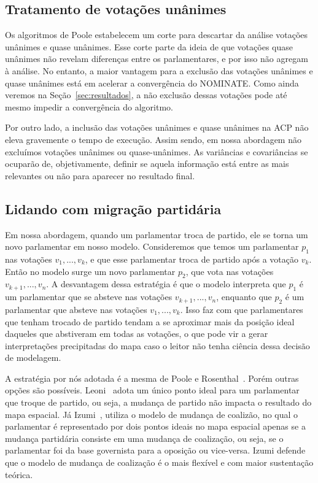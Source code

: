 \documentclass[a4paper, 12pt]{article}
\newcommand\nominate{NOMINATE\xspace}
\begin{document}
\subsection{Tratamento de votações unânimes}

Os algoritmos de Poole estabelecem um corte para descartar da análise votações unânimes e quase unânimes. Esse corte parte da ideia de que votações quase unânimes não revelam diferenças entre os parlamentares, e por isso não agregam à análise. No entanto, a maior vantagem para a exclusão das votações unânimes e quase unânimes está em acelerar a convergência do \nominate. Como ainda veremos na Seção~\ref{sec:resultados}, a não exclusão dessas votações pode até mesmo impedir a convergência do algoritmo.

Por outro lado, a inclusão das votações unânimes e quase unânimes na ACP não eleva gravemente o tempo de execução. Assim sendo, em nossa abordagem não excluímos votações unânimes ou quase-unânimes. As variâncias e covariâncias se ocuparão de, objetivamente, definir se aquela informação está entre as mais relevantes ou não para aparecer no resultado final.

\subsection{Lidando com migração partidária}

Em nossa abordagem, quando um parlamentar troca de partido, ele se torna um novo parlamentar em nosso modelo. Consideremos que temos um parlamentar $p_1$ nas votações $v_1, ..., v_k$, e que esse parlamentar troca de partido após a votação $v_k$. Então no modelo surge um novo parlamentar $p_2$, que vota nas votações $v_{k+1}, ..., v_n$. A desvantagem dessa estratégia é que o modelo interpreta que $p_1$ é um parlamentar que se absteve nas votações $v_{k+1}, ..., v_n$, enquanto que $p_2$ é um parlamentar que absteve nas votações $v_1, ..., v_k$. Isso faz com que parlamentares que tenham trocado de partido tendam a se aproximar mais da posição ideal daqueles que abstiveram em todas as votações, o que pode vir a gerar interpretações precipitadas do mapa caso o leitor não tenha ciência dessa decisão de modelagem.

A estratégia por nós adotada é a mesma de Poole e Rosenthal~\cite{poole2007ideology}. Porém outras opções são possíveis. Leoni~\cite{leoni02cdep} adota um único ponto ideal para um parlamentar que troque de partido, ou seja, a mudança de partido não impacta o resultado do mapa espacial. Já Izumi~\cite{izumi2016senado}, utiliza o modelo de mudança de coalizão, no qual o parlamentar é representado por dois pontos ideais no mapa espacial apenas se a mudança partidária consiste em uma mudança de coalização, ou seja, se o parlamentar foi da base governista para a oposição ou vice-versa. Izumi defende que o modelo de mudança de coalização é o mais flexível e com maior sustentação teórica. 
\end{document}
